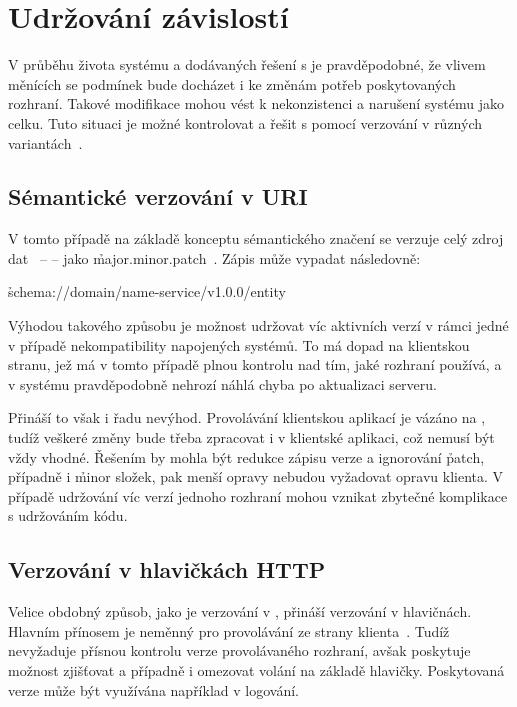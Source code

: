 \section{Udržování závislostí}\label{sec:msa-dependencies}

V průběhu života systému a dodávaných řešení s  je pravděpodobné, že vlivem měnících se podmínek bude docházet i ke změnám potřeb poskytovaných rozhraní.
Takové modifikace mohou vést k nekonzistenci a narušení systému jako celku.
Tuto situaci je možné kontrolovat a řešit s pomocí verzování v různých variantách~\cite{msversions}.



\subsection{Sémantické verzování v URI}\label{subsec:msa-dependencies-uri}

V tomto případě na základě konceptu sémantického značení se verzuje celý zdroj dat~\cite{msversions} –  – jako \h{major.minor.patch}~\cite{semver}.
Zápis může vypadat následovně:

\h{schema://domain/name-service/v1.0.0/entity}

Výhodou takového způsobu je možnost udržovat víc aktivních  verzí v rámci jedné  v případě nekompatibility napojených systémů.
To má dopad na klientskou stranu, jež má v tomto případě plnou kontrolu nad tím, jaké rozhraní používá, a v systému pravděpodobně nehrozí náhlá chyba po aktualizaci serveru.

Přináší to však i řadu nevýhod.
Provolávání  klientskou aplikací je vázáno na , tudíž veškeré změny bude třeba zpracovat i v klientské aplikaci, což nemusí být vždy vhodné.
Řešením by mohla být redukce zápisu verze a ignorování \h{patch}, případně i \h{minor} složek, pak menší opravy nebudou vyžadovat opravu klienta.
V případě udržování víc verzí jednoho rozhraní mohou vznikat zbytečné komplikace s udržováním kódu.



\subsection{Verzování v hlavičkách HTTP}\label{subsec:msa-dependencies-headers}

Velice obdobný způsob, jako je verzování v , přináší verzování v  hlavičnách.
Hlavním přínosem je neměnný  pro provolávání ze strany klienta~\cite{msversions}.
Tudíž nevyžaduje přísnou kontrolu verze provolávaného rozhraní, avšak poskytuje možnost zjišťovat a případně i omezovat volání na základě hlavičky.
Poskytovaná verze může být využívána například v logování.



